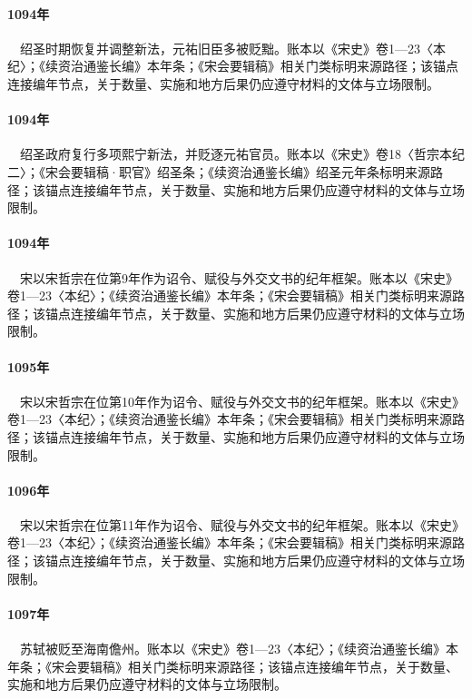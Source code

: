 \paragraph{1094年}　绍圣时期恢复并调整新法，元祐旧臣多被贬黜。账本以《宋史》卷1—23〈本纪〉；《续资治通鉴长编》本年条；《宋会要辑稿》相关门类标明来源路径；该锚点连接编年节点，关于数量、实施和地方后果仍应遵守材料的文体与立场限制。

\paragraph{1094年}　绍圣政府复行多项熙宁新法，并贬逐元祐官员。账本以《宋史》卷18〈哲宗本纪二〉；《宋会要辑稿·职官》绍圣条；《续资治通鉴长编》绍圣元年条标明来源路径；该锚点连接编年节点，关于数量、实施和地方后果仍应遵守材料的文体与立场限制。

\paragraph{1094年}　宋以宋哲宗在位第9年作为诏令、赋役与外交文书的纪年框架。账本以《宋史》卷1—23〈本纪〉；《续资治通鉴长编》本年条；《宋会要辑稿》相关门类标明来源路径；该锚点连接编年节点，关于数量、实施和地方后果仍应遵守材料的文体与立场限制。

\paragraph{1095年}　宋以宋哲宗在位第10年作为诏令、赋役与外交文书的纪年框架。账本以《宋史》卷1—23〈本纪〉；《续资治通鉴长编》本年条；《宋会要辑稿》相关门类标明来源路径；该锚点连接编年节点，关于数量、实施和地方后果仍应遵守材料的文体与立场限制。

\paragraph{1096年}　宋以宋哲宗在位第11年作为诏令、赋役与外交文书的纪年框架。账本以《宋史》卷1—23〈本纪〉；《续资治通鉴长编》本年条；《宋会要辑稿》相关门类标明来源路径；该锚点连接编年节点，关于数量、实施和地方后果仍应遵守材料的文体与立场限制。

\paragraph{1097年}　苏轼被贬至海南儋州。账本以《宋史》卷1—23〈本纪〉；《续资治通鉴长编》本年条；《宋会要辑稿》相关门类标明来源路径；该锚点连接编年节点，关于数量、实施和地方后果仍应遵守材料的文体与立场限制。

